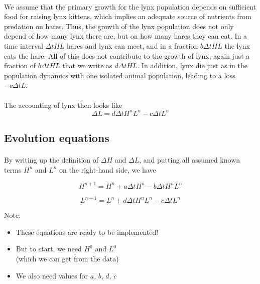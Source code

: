 \documentclass[%
oneside,                 %
final,                   %
10pt]{article}
\begin{document}
\paragraph{}
We assume that the primary growth for the lynx population depends on sufficient food for raising lynx kittens, which implies an adequate source of nutrients from predation on hares. Thus, the growth of the lynx population does not only depend of how many lynx there are, but on how many hares they can eat.
In a time interval $\Delta t HL$ hares and lynx can meet, and in a
fraction $b\Delta t HL$ the lynx eats the hare. All of this does not
contribute to the growth of lynx, again just a fraction of
$b\Delta t HL$ that we write as
$d\Delta t HL$. In addition, lynx die just as in the population
dynamics with one isolated animal population, leading to a loss
$-c\Delta t L$.




\paragraph{}
The accounting of lynx then looks like
\[ \Delta L = d\Delta t H^nL^n - c\Delta t L^n\]



\subsection*{Evolution equations}


\paragraph{}
By writing up the definition of $\Delta H$ and $\Delta L$, and putting
all assumed known terms $H^n$ and $L^n$ on the right-hand side, we have

\[ H^{n+1} = H^n + a\Delta t H^n - b\Delta t H^n L^n \]

\[ L^{n+1} = L^n + d\Delta t H^nL^n - c\Delta t L^n \]

Note:

\begin{itemize}
 \item These equations are ready to be implemented!

 \item But to start, we need $H^0$ and $L^0$ \\
   (which we can get from the data)

 \item We also need values for $a$, $b$, $d$, $c$
\end{itemize}
\end{document}
